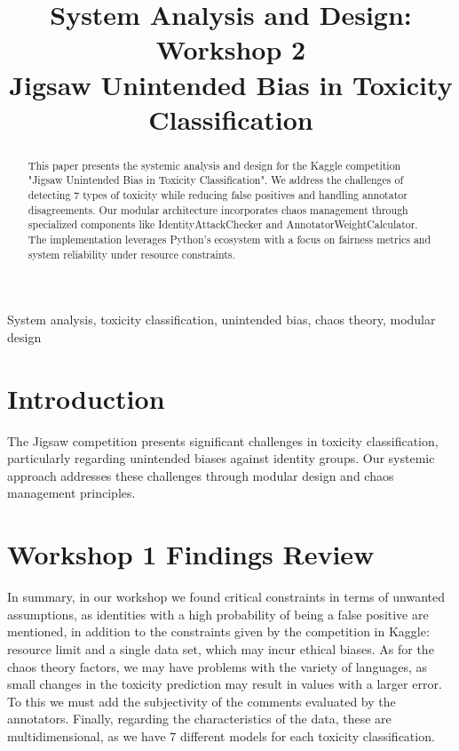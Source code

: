 \documentclass[conference]{IEEEtran}
\begin{document}
\title{System Analysis and Design: Workshop 2 \\ Jigsaw Unintended Bias in Toxicity Classification}

\author{
    \and
    \and
}

\maketitle

\begin{abstract}
This paper presents the systemic analysis and design for the Kaggle competition "Jigsaw Unintended Bias in Toxicity Classification". We address the challenges of detecting 7 types of toxicity while reducing false positives and handling annotator disagreements. Our modular architecture incorporates chaos management through specialized components like IdentityAttackChecker and AnnotatorWeightCalculator. The implementation leverages Python's ecosystem with a focus on fairness metrics and system reliability under resource constraints.
\end{abstract}

\begin{IEEEkeywords}
System analysis, toxicity classification, unintended bias, chaos theory, modular design
\end{IEEEkeywords}

\section{Introduction}
The Jigsaw competition presents significant challenges in toxicity classification, particularly regarding unintended biases against identity groups. Our systemic approach addresses these challenges through modular design and chaos management principles.

\section{Workshop 1 Findings Review}
In summary, in our workshop we found critical constraints in terms of unwanted assumptions, as identities with a high probability of being a false positive are mentioned, in addition to the constraints given by the competition in Kaggle: resource limit and a single data set, which may incur ethical biases.
As for the chaos theory factors, we may have problems with the variety of languages, as small changes in the toxicity prediction may result in values with a larger error. To this we must add the subjectivity of the comments evaluated by the annotators.
Finally, regarding the characteristics of the data, these are multidimensional, as we have 7 different models for each toxicity classification.
\end{document}
